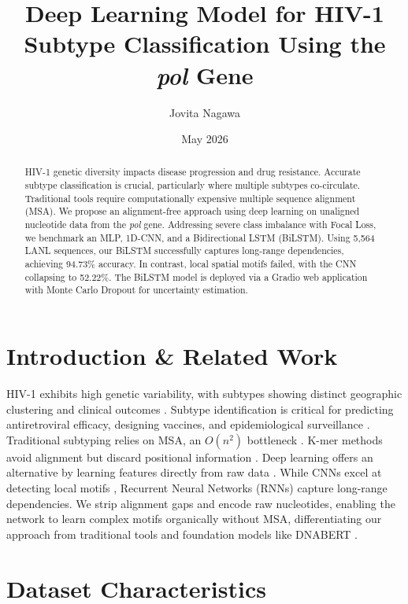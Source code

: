 \documentclass[12pt, a4paper]{article}
\title{\textbf{Deep Learning Model for HIV-1 Subtype Classification Using the \textit{pol} Gene}}
\author{Jovita Nagawa}
\affil{MSB7216: Deep Learning for Health Data — Final Project Report}
\date{May 2026}
\begin{document}
\maketitle

\vspace{1cm}
\tableofcontents

\newpage

\begin{abstract}
\noindent HIV-1 genetic diversity impacts disease progression and drug resistance. Accurate subtype classification is crucial, particularly where multiple subtypes co-circulate. Traditional tools require computationally expensive multiple sequence alignment (MSA). We propose an alignment-free approach using deep learning on unaligned nucleotide data from the \textit{pol} gene. Addressing severe class imbalance with Focal Loss, we benchmark an MLP, 1D-CNN, and a Bidirectional LSTM (BiLSTM). Using 5,564 LANL sequences, our BiLSTM successfully captures long-range dependencies, achieving 94.73\% accuracy. In contrast, local spatial motifs failed, with the CNN collapsing to 52.22\%. The BiLSTM model is deployed via a Gradio web application with Monte Carlo Dropout for uncertainty estimation.
\end{abstract}

\section{Introduction \& Related Work}
HIV-1 exhibits high genetic variability, with subtypes showing distinct geographic clustering and clinical outcomes \cite{solis2018open}. Subtype identification is critical for predicting antiretroviral efficacy, designing vaccines, and epidemiological surveillance \cite{fabris2019deep}. Traditional subtyping relies on MSA, an $O(n^2)$ bottleneck \cite{pineda2013automated, struck2014comet}. K-mer methods avoid alignment but discard positional information \cite{solis2018open}. Deep learning offers an alternative by learning features directly from raw data \cite{lecun2015deep}. While CNNs excel at detecting local motifs \cite{alipanahi2015predicting}, Recurrent Neural Networks (RNNs) capture long-range dependencies. We strip alignment gaps and encode raw nucleotides, enabling the network to learn complex motifs organically without MSA, differentiating our approach from traditional tools and foundation models like DNABERT \cite{ji2021dnabert}.

\section{Dataset Characteristics}
\end{document}
